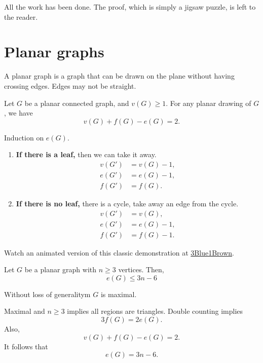 \begin{dem}
	All the work has been done. The proof, which is simply a jigsaw puzzle, is left to the reader.
\end{dem}

\newpage
\section{Planar graphs}

\begin{defn}
	A planar graph is a graph that can be drawn on the plane without having crossing edges. Edges may not be straight.
\end{defn}

\begin{lem}[$V + F - E = 2$]
	Let $G$ be a planar connected graph, and $v(G) \ge 1$. For any planar drawing of $G$, we have \[
		v(G) + f(G) - e(G) = 2.
	\]
\end{lem}

\begin{sk}
	Induction on $e(G)$.

	\begin{enumerate}
		\item \textbf{If there is a leaf,} then we can take it away.
			\begin{align*}
				v(G') &= v(G) - 1, \\
				e(G') &= e(G) - 1, \\
				f(G') &= f(G).
			\end{align*}
		\item \textbf{If there is no leaf,} there is a cycle, take away an edge from the cycle.
			\begin{align*}
				v(G') &= v(G),     \\
				e(G') &= e(G) - 1, \\
				f(G') &= f(G) - 1. 
			\end{align*}
	\end{enumerate}
\end{sk}

	Watch an animated version of this classic demonstration at \href{https://youtu.be/VvCytJvd4H0?t=382}{3Blue1Brown}.

\begin{thm}
	Let $G$ be a planar graph with $n \ge 3$ vertices. Then, \[
		e(G) \le 3n - 6
	\]
\end{thm}

\begin{dem}
	Without loss of generalitym $G$ is maximal.

	Maximal and $n \ge 3$ implies all regions are triangles. Double counting implies \[
		3f(G) = 2e(G).
	\]
	Also, \[
		v(G) + f(G) - e(G) = 2.
	\]
	It follows that	\[
		e(G) = 3n - 6.
	\]
\end{dem}

